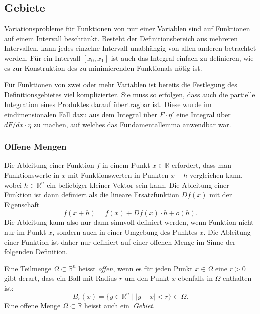 %
%
%

%
%
\subsection{Gebiete}
Variationsprobleme für Funktionen von nur einer Variablen sind auf 
Funktionen auf einem Intervall beschränkt.
Besteht der Definitionsbereich aus mehreren Intervallen, kann jedes
einzelne Intervall unabhängig von allen anderen betrachtet werden.
Für ein Intervall $[x_0,x_1]$ ist auch das Integral einfach zu definieren,
wie es zur Konstruktion des zu minimierenden Funktionals nötig ist.

Für Funktionen von zwei oder mehr Variablen ist bereits die
Festlegung des Definitionsgebietes viel komplizierter.
Sie muss so erfolgen, dass auch die partielle Integration eines
Produktes darauf übertragbar ist.
Diese wurde im eindimensionalen Fall dazu aus dem Integral
über $F\cdot\eta'$ eine Integral über $dF/dx\cdot \eta$ zu
machen, auf welches das Fundamentallemma anwendbar war.

%
%
\subsubsection{Offene Mengen}
Die Ableitung einer Funktion $f$ in einem Punkt $x\in\mathbb{R}$ erfordert,
dass man Funktionswerte in $x$ mit Funktionswerten in Punkten $x+h$
vergleichen kann, wobei $h\in\mathbb{R}^n$ ein beliebiger kleiner Vektor
sein kann.
Die Ableitung einer Funktion ist dann definiert als die lineare
Ersatzfunktion $Df(x)$ mit der Eigenschaft
\[
f(x+h) = f(x) + Df(x)\cdot h + o(h).
\]
Die Ableitung kann also nur dann sinnvoll definiert werden, wenn
Funktion nicht nur im Punkt $x$, sondern auch in einer Umgebung
des Punktes $x$.
Die Ableitung einer Funktion ist daher nur definiert auf einer
offenen Menge im Sinne der folgenden Definition.


\begin{definition}
Eine Teilmenge $\Omega\subset\mathbb{R}^n$ heisst {\em offen}, wenn es für
%
jeden Punkt $x\in\Omega$ eine $r>0$ gibt derart, dass ein
Ball mit Radius $r$ um den Punkt $x$ ebenfalls in $\Omega$ enthalten
ist:
\[
B_r(x)
=
\{y\in\mathbb{R}^n
\mid
|y-x|<r\}
\subset \Omega.
\]
Eine offene Menge $\Omega\subset\mathbb{R}$ heisst auch ein {\em Gebiet}.
%
\end{definition}

